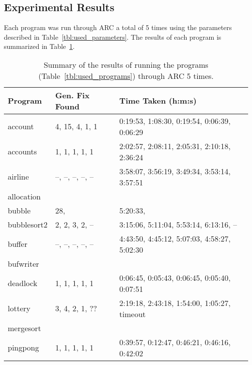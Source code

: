 \subsection{Experimental Results}
\label{sec:experimental_results}

Each program was run through ARC a total of 5 times using the parameters
described in Table~\ref{tbl:used_parameters}. The results of each program is
summarized in Table~\ref{tbl:summary_results}.

\begin{table}%
\caption{Summary of the results of running the programs
(Table~\ref{tbl:used_programs}) through ARC 5 times.}
\begin{center}
\lstset{basicstyle=\scriptsize}
\begin{tabular}{|l|l|l|}
\hline
\textbf{Program} & \textbf{Gen. Fix Found} & \textbf{Time Taken (h:m:s)}\\
\hline
account & 4, 15, 4, 1, 1 & 0:19:53, 1:08:30, 0:19:54, 0:06:39, 0:06:29\\
\hline
accounts & 1, 1, 1, 1, 1 & 2:02:57, 2:08:11, 2:05:31, 2:10:18, 2:36:24\\
\hline
airline & --, --, --, --, -- & 3:58:07, 3:56:19, 3:49:34, 3:53:14, 3:57:51\\
\hline
allocation &  & \\
\hline
bubble & 28, & 5:20:33, \\
\hline
bubblesort2 & 2, 2, 3, 2, -- & 3:15:06, 5:11:04, 5:53:14, 6:13:16, -- \\
\hline
buffer & --, --, --, --, -- & 4:43:50, 4:45:12, 5:07:03, 4:58:27, 5:02:30\\
\hline
bufwriter &  & \\
\hline
deadlock & 1, 1, 1, 1, 1 & 0:06:45, 0:05:43, 0:06:45, 0:05:40, 0:07:51\\
\hline
lottery & 3, 4, 2, 1, ?? & 2:19:18, 2:43:18, 1:54:00, 1:05:27, timeout\\
\hline
mergesort & & \\
\hline
pingpong & 1, 1, 1, 1, 1 & 0:39:57, 0:12:47, 0:46:21, 0:46:16, 0:42:02\\
\hline
\end{tabular}
\label{tbl:summary_results}
\end{center}
\end{table}
